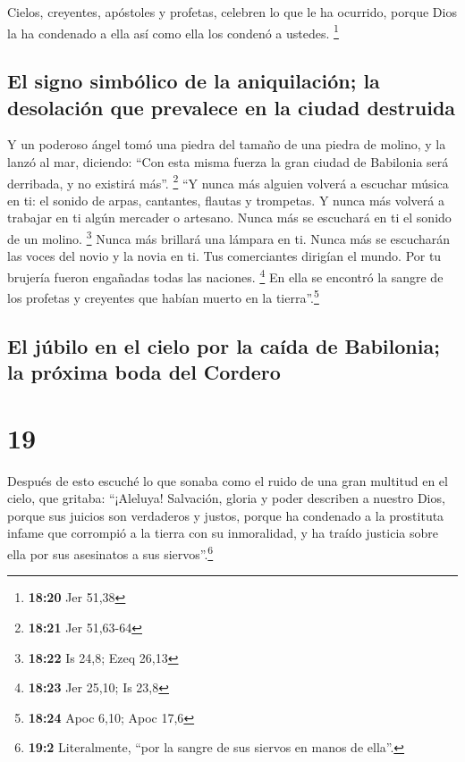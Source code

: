  Cielos, creyentes, apóstoles y profetas, celebren lo que
le ha ocurrido, porque Dios la ha condenado a ella así como ella los
condenó a ustedes. \footnote{\textbf{18:20} Jer 51,38}

\hypertarget{el-signo-simbuxf3lico-de-la-aniquilaciuxf3n-la-desolaciuxf3n-que-prevalece-en-la-ciudad-destruida}{%
\subsection{El signo simbólico de la aniquilación; la desolación que
prevalece en la ciudad
destruida}\label{el-signo-simbuxf3lico-de-la-aniquilaciuxf3n-la-desolaciuxf3n-que-prevalece-en-la-ciudad-destruida}}

 Y un poderoso ángel tomó una piedra del tamaño de una
piedra de molino, y la lanzó al mar, diciendo: ``Con esta misma fuerza
la gran ciudad de Babilonia será derribada, y no existirá más''.
\footnote{\textbf{18:21} Jer 51,63-64}  ``Y nunca más
alguien volverá a escuchar música en ti: el sonido de arpas, cantantes,
flautas y trompetas. Y nunca más volverá a trabajar en ti algún mercader
o artesano. Nunca más se escuchará en ti el sonido de un molino.
\footnote{\textbf{18:22} Is 24,8; Ezeq 26,13}  Nunca más
brillará una lámpara en ti. Nunca más se escucharán las voces del novio
y la novia en ti. Tus comerciantes dirigían el mundo. Por tu brujería
fueron engañadas todas las naciones. \footnote{\textbf{18:23} Jer 25,10;
  Is 23,8}  En ella se encontró la sangre de los profetas
y creyentes que habían muerto en la tierra''.\footnote{\textbf{18:24}
  Apoc 6,10; Apoc 17,6}

\hypertarget{el-juxfabilo-en-el-cielo-por-la-cauxedda-de-babilonia-la-pruxf3xima-boda-del-cordero}{%
\subsection{El júbilo en el cielo por la caída de Babilonia; la próxima
boda del
Cordero}\label{el-juxfabilo-en-el-cielo-por-la-cauxedda-de-babilonia-la-pruxf3xima-boda-del-cordero}}

\hypertarget{section-18}{%
\section{19}\label{section-18}}

 Después de esto escuché lo que sonaba como el ruido de
una gran multitud en el cielo, que gritaba: ``¡Aleluya! Salvación,
gloria y poder describen a nuestro Dios,  porque sus
juicios son verdaderos y justos, porque ha condenado a la prostituta
infame que corrompió a la tierra con su inmoralidad, y ha traído
justicia sobre ella por sus asesinatos a sus siervos''.\footnote{\textbf{19:2}
  Literalmente, ``por la sangre de sus siervos en manos de ella''.}

